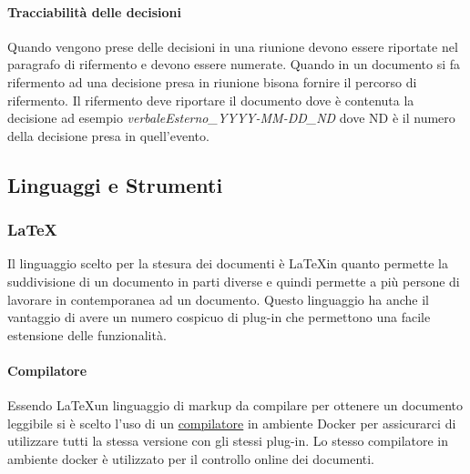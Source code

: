     \paragraph{Tracciabilità delle decisioni}
      Quando vengono prese delle decisioni in una riunione devono essere
      riportate nel paragrafo di rifermento e devono essere numerate.
      Quando in un documento si fa rifermento ad una decisione presa in riunione
      bisona fornire il percorso di rifermento.
      Il rifermento deve riportare il documento dove è contenuta la decisione
      ad esempio \textit{verbaleEsterno\_YYYY-MM-DD\_ND} dove ND è il numero della
      decisione presa in quell'evento.


  \subsection{Linguaggi e Strumenti}
  \subsubsection{\LaTeX}
  Il linguaggio scelto per la stesura dei documenti è \LaTeX \space in quanto permette
  la suddivisione di un documento in parti diverse e quindi permette a più persone
  di lavorare in contemporanea ad un documento.
  Questo linguaggio ha anche il vantaggio di avere un numero cospicuo di plug-in
  che permettono una facile estensione delle funzionalità.

  \paragraph{Compilatore}
  Essendo \LaTeX \space un linguaggio di markup da compilare per ottenere un documento
  leggibile si è scelto l'uso di un
  \href{https://github.com/dante-ev/docker-texlive}{compilatore} in ambiente Docker\glo
  per assicurarci di utilizzare tutti la stessa versione con gli stessi plug-in.
  Lo stesso compilatore in ambiente docker è utilizzato per il controllo online dei
  documenti.
